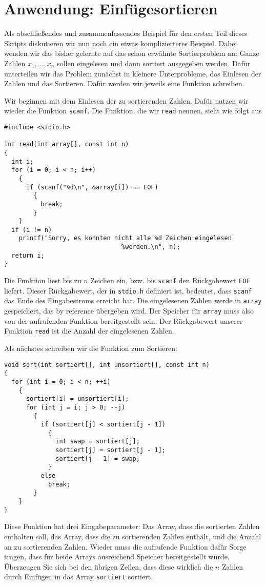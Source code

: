 \section{Anwendung: Einfügesortieren}

Als abschließendes und zusammenfassendes Beispiel für den ersten Teil dieses Skripts diskutieren wir nun noch ein etwas komplizierteres Beispiel.
Dabei wenden wir das bisher gelernte auf das schon erwähnte Sortierproblem an:
Ganze Zahlen $x_1, \ldots, x_n$ sollen eingelesen und dann sortiert ausgegeben werden.
Dafür unterteilen wir das Problem zunächst in kleinere Unterprobleme, das Einlesen der Zahlen und das Sortieren.
Dafür werden wir jeweils eine Funktion schreiben.

Wir beginnen mit dem Einlesen der zu sortierenden Zahlen.
Dafür nutzen wir wieder die Funktion \verb|scanf|.
Die Funktion, die wir \verb|read| nennen, sieht wie folgt aus
\begin{lstlisting}
#include <stdio.h>

int read(int array[], const int n)
{
  int i;
  for (i = 0; i < n; i++)
    {
      if (scanf("%d\n", &array[i]) == EOF)
        {
          break;
        }
    }
  if (i != n)
    printf("Sorry, es konnten nicht alle %d Zeichen eingelesen
                                %werden.\n", n);
  return i;
}
\end{lstlisting}
Die Funktion liest bis zu $n$ Zeichen ein, bzw. bis \verb|scanf| den Rückgabewert \verb|EOF| liefert.
Dieser Rückgabewert, der in \verb|stdio.h| definiert ist, bedeutet, dass \verb|scanf| das Ende des Eingabestroms erreicht hat.
Die eingelesenen Zahlen werde in \verb|array| gespeichert, das by reference übergeben wird.
Der Speicher für \verb|array| muss also von der aufrufenden Funktion bereitgestellt sein.
Der Rückgabewert unserer Funktion \verb|read| ist die Anzahl der eingelesenen Zahlen.

Als nächstes schreiben wir die Funktion zum Sortieren:
\begin{lstlisting}
void sort(int sortiert[], int unsortiert[], const int n)
{
  for (int i = 0; i < n; ++i)
    {
      sortiert[i] = unsortiert[i];
      for (int j = i; j > 0; --j)
        {
          if (sortiert[j] < sortiert[j - 1])
            {
              int swap = sortiert[j];
              sortiert[j] = sortiert[j - 1];
              sortiert[j - 1] = swap;
            }
          else
            break;
        }
    }
}
\end{lstlisting}
Diese Funktion hat drei Eingabeparameter: Das Array, dass die sortierten Zahlen enthalten soll, das Array, dass die zu sortierenden Zahlen enthält, und die Anzahl an zu sortierenden Zahlen.
Wieder muss die aufrufende Funktion dafür Sorge tragen, dass für beide Arrays ausreichend Speicher bereitgestellt wurde.
Überzeugen Sie sich bei den übrigen Zeilen, dass diese wirklich die $n$ Zahlen durch Einfügen in das Array \verb|sortiert| sortiert.

